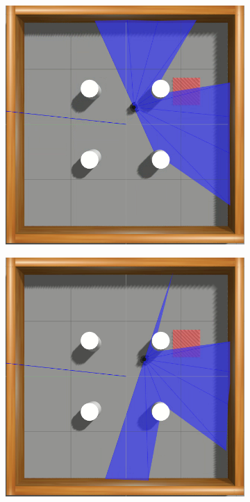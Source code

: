 \begin{figure}[htbp]
\begin{subfigure}[b]{0.115\textwidth}
    \end{subfigure}
    \newline
    \begin{subfigure}[b]{0.115\textwidth}
        \includegraphics[width=\textwidth]{images/simenv2/5.png}
    \end{subfigure}
    \hfill
    \begin{subfigure}[b]{0.115\textwidth}
        \includegraphics[width=\textwidth]{images/simenv2/6.png}

\end{subfigure}
\end{figure}
